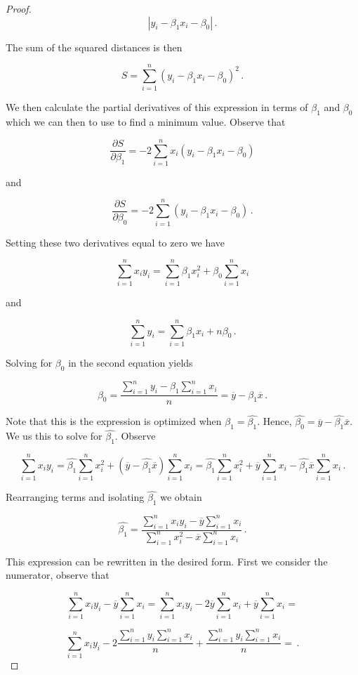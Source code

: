 \documentclass[a4paper]{article}
\newcommand{\br} [1] {\overline{#1}}
\numberwithin{equation}{section}
\begin{document}
\begin{description}
\begin{proof}
$$|y_i - \beta_1x_i - \beta_0|\,.$$

The sum of the squared distances is then

$$S = \sum \limits_{i=1}^n (y_i - \beta_1x_i - \beta_0)^2\,.$$

We then calculate the partial derivatives of this expression in terms of $\beta_1$ and $\beta_0$ which we can then to use to find a minimum value. Observe that

$$\frac{\partial S}{\partial \beta_1} = -2\sum \limits_{i=1}^n x_i(y_i - \beta_1x_i - \beta_0)$$

and

$$\frac{\partial S}{\partial \beta_0} = -2\sum \limits_{i=1}^n (y_i - \beta_1x_i - \beta_0)\,.$$

Setting these two derivatives equal to zero we have

$$\sum \limits_{i=1}^n x_iy_i = \sum \limits_{i=1}^n \beta_1 x_i^2  + \beta_0 \sum \limits_{i=1}^n x_i$$

and

$$\sum \limits_{i=1}^n y_i = \sum \limits_{i=1}^n \beta_1x_i + n\beta_0\,.$$

Solving for $\beta_0$ in the second equation yields 

$$\beta_0 = \frac{\sum _{i=1}^n y_i - \beta_1\sum _{i=1}^nx_i}{n} = \br{y} - \beta_1\br{x}\,.$$

Note that this is the expression is optimized when $\beta_1 = \hat{\beta_1}$. Hence, $\hat{\beta_0} = \br{y} - \hat{\beta_1}\br{x}$. We us this to solve for $\hat{\beta_1}$. Observe

$$\sum \limits_{i=1}^n x_iy_i = \hat{\beta_1} \sum \limits_{i=1}^n x_i^2  + (\br{y} - \hat{\beta_1}\br{x})\sum \limits_{i=1}^n x_i = \hat{\beta_1} \sum \limits_{i=1}^n x_i^2  + \br{y}\sum \limits_{i=1}^n x_i - \hat{\beta_1}\br{x}\sum \limits_{i=1}^n x_i\,.$$

Rearranging terms and isolating $\hat{\beta_1}$ we obtain

$$\hat{\beta_1} = \frac{\sum_{i=1}^n x_iy_i - \br{y}\sum_{i=1}^n x_i}{\sum_{i=1}^n x_i^2 - \br{x}\sum_{i=1}^n x_i}\,.$$

This expression can be rewritten in the desired form. First we consider the numerator, observe that

$$\sum \limits_{i=1}^n x_iy_i - \br{y}\sum \limits_{i=1}^n x_i = \sum \limits_{i=1}^n x_iy_i - 2\br{y}\sum \limits_{i=1}^n x_i + \br{y}\sum \limits_{i=1}^n x_i =$$

$$\sum \limits_{i=1}^n x_iy_i - 2\frac{\sum_{i=1}^ny_i\sum_{i=1}^n x_i}{n} + \frac{\sum_{i=1}^ny_i\sum_{i=1}^n x_i}{n} = \,.$$


\end{proof}
\end{description}
\end{document}
